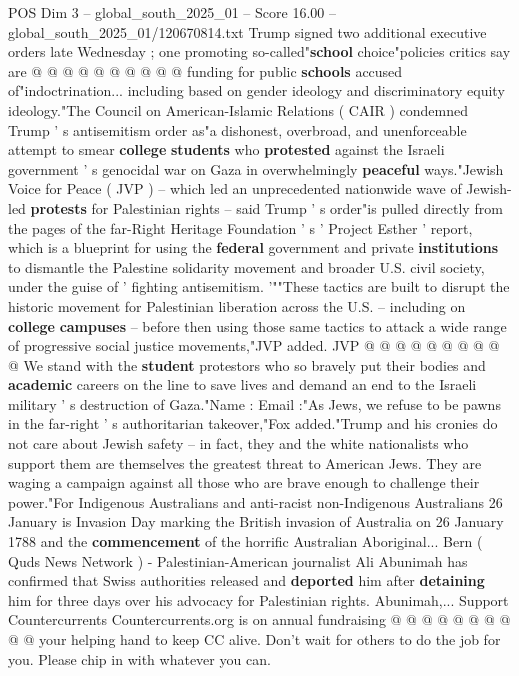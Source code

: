 \begin{textsample}{POS Dim 3 – global\_south\_2025\_01 – Score 16.00 – global\_south\_2025\_01/120670814.txt}
Trump signed two additional executive orders late Wednesday ; one promoting so-called"\textbf{school} choice"policies critics say are @ @ @ @ @ @ @ @ @ @ funding for public \textbf{schools} accused of"indoctrination... including based on gender ideology and discriminatory equity ideology."The Council on American-Islamic Relations ( CAIR ) condemned Trump ' s antisemitism order as"a dishonest, overbroad, and unenforceable attempt to smear \textbf{college} \textbf{students} who \textbf{protested} against the Israeli government ' s genocidal war on Gaza in overwhelmingly \textbf{peaceful} ways."Jewish Voice for Peace ( JVP ) -- which led an unprecedented nationwide wave of Jewish-led \textbf{protests} for Palestinian rights -- said Trump ' s order"is pulled directly from the pages of the far-Right Heritage Foundation ' s ' Project Esther ' report, which is a blueprint for using the \textbf{federal} government and private \textbf{institutions} to dismantle the Palestine solidarity movement and broader U.S. civil society, under the guise of ' fighting antisemitism. '""These tactics are built to disrupt the historic movement for Palestinian liberation across the U.S. -- including on \textbf{college} \textbf{campuses} -- before then using those same tactics to attack a wide range of progressive social justice movements,"JVP added.
JVP @ @ @ @ @ @ @ @ @ @ We stand with the \textbf{student} protestors who so bravely put their bodies and \textbf{academic} careers on the line to save lives and demand an end to the Israeli military ' s destruction of Gaza."Name : Email :"As Jews, we refuse to be pawns in the far-right ' s authoritarian takeover,"Fox added."Trump and his cronies do not care about Jewish safety -- in fact, they and the white nationalists who support them are themselves the greatest threat to American Jews.
They are waging a campaign against all those who are brave enough to challenge their power."For Indigenous Australians and anti-racist non-Indigenous Australians 26 January is Invasion Day marking the British invasion of Australia on 26 January 1788 and the \textbf{commencement} of the horrific Australian Aboriginal...
Bern ( Quds News Network ) - Palestinian-American journalist Ali Abunimah has confirmed that Swiss authorities released and \textbf{deported} him after \textbf{detaining} him for three days over his advocacy for Palestinian rights.
Abunimah,...
Support Countercurrents Countercurrents.org is on annual fundraising @ @ @ @ @ @ @ @ @ @ your helping hand to keep CC alive.
Don't wait for others to do the job for you.
Please chip in with whatever you can.

\end{textsample}
